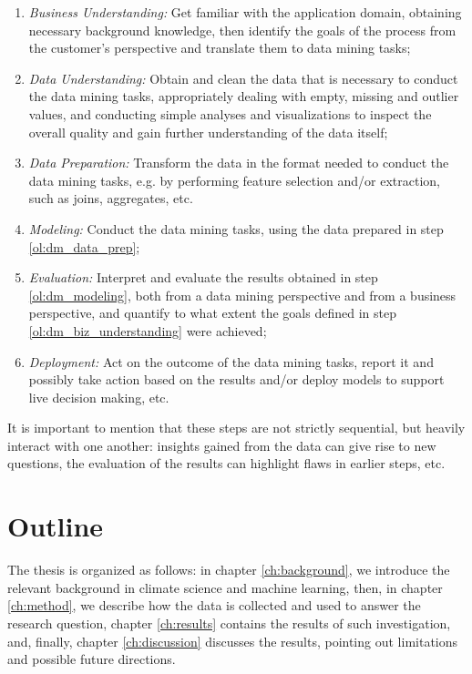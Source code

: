 \documentclass[a4paper]{book}
\begin{document}
\begin{enumerate}
\item \emph{Business Understanding:} Get familiar with the application domain, obtaining necessary background knowledge, then identify the goals of the process from the customer's perspective and translate them to data mining tasks;
\label{ol:dm_biz_understanding}

\item \emph{Data Understanding:} Obtain and clean the data that is necessary to conduct the data mining tasks, appropriately dealing with empty, missing and outlier values, and conducting simple analyses and visualizations to inspect the overall quality and gain further understanding of the data itself;
\label{ol:dm_data_understanding}

\item \emph{Data Preparation:} Transform the data in the format needed to conduct the data mining tasks, e.g. by performing feature selection and/or extraction, such as joins, aggregates, etc.
\label{ol:dm_data_prep}

\item \emph{Modeling:} Conduct the data mining tasks, using the data prepared in step \ref{ol:dm_data_prep};
\label{ol:dm_modeling}

\item \emph{Evaluation:} Interpret and evaluate the results obtained in step \ref{ol:dm_modeling}, both from a data mining perspective and from a business perspective, and quantify to what extent the goals defined in step \ref{ol:dm_biz_understanding} were achieved;
\label{ol:dm_eval}

\item \emph{Deployment:} Act on the outcome of the data mining tasks, report it and possibly take action based on the results and/or deploy models to support live decision making, etc.
\label{ol:deploy}
\end{enumerate}

It is important to mention that these steps are not strictly sequential, but heavily interact with one another: insights gained from the data can give rise to new questions, the evaluation of the results can highlight flaws in earlier steps, etc.


\section{Outline}
\label{sec:outline}
The thesis is organized as follows: in chapter \ref{ch:background}, we introduce the relevant background in climate science and machine learning, then, in chapter \ref{ch:method}, we describe how the data is collected and used to answer the research question, chapter \ref{ch:results} contains the results of such investigation, and, finally, chapter \ref{ch:discussion} discusses the results, pointing out limitations and possible future directions.
\end{document}
